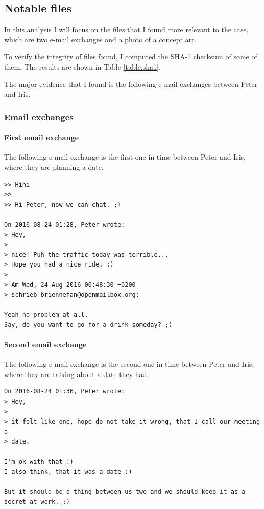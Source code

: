 \documentclass[12pt]{article}
\begin{document}
\subsection{Notable files}

In this analysis I will focus on the files that I found more relevant to the case, which are two e-mail exchanges and a photo of a concept art.

To verify the integrity of files found, I computed the SHA-1 checksum of some of them. The results are shown in Table \ref{table:sha1}.

The major evidence that I found is the following e-mail exchanges between Peter and Iris.

\subsubsection{Email exchanges}

\paragraph{First email exchange}
\label{sec:first-mail}

The following e-mail exchange is the first one in time between Peter and Iris, where they are planning a date.

\begin{shaded}
\begin{verbatim}
>> Hihi
>> 
>> Hi Peter, now we can chat. ;)

On 2016-08-24 01:28, Peter wrote:
> Hey,
> 
> nice! Puh the traffic today was terrible...
> Hope you had a nice ride. :)
> 
> Am Wed, 24 Aug 2016 00:48:30 +0200
> schrieb briennefan@openmailbox.org:

Yeah no problem at all.
Say, do you want to go for a drink someday? ;)
\end{verbatim}
\end{shaded}

\paragraph{Second email exchange}
The following e-mail exchange is the second one in time between Peter and Iris, where they are talking about a date they had.

\begin{shaded}
\begin{verbatim}
On 2016-08-24 01:36, Peter wrote:
> Hey,
> 
> it felt like one, hope do not take it wrong, that I call our meeting a
> date.

I'm ok with that :)
I also think, that it was a date :)

But it should be a thing between us two and we should keep it as a 
secret at work. ;)
\end{verbatim}
\end{shaded}
\end{document}

